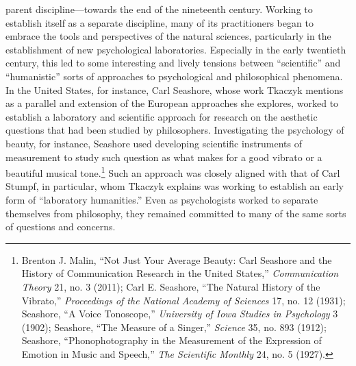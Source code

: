 \documentclass{tufte-handout}
\begin{document}
\noindent parent
discipline---towards the end of the nineteenth century. Working to
establish itself as a separate discipline, many of its practitioners
began to embrace the tools and perspectives of the natural sciences,
particularly in the establishment of new psychological laboratories.
Especially in the early twentieth century, this led to some interesting
and lively tensions between ``scientific'' and ``humanistic'' sorts of
approaches to psychological and philosophical phenomena. In the United
States, for instance, Carl Seashore, whose work Tkaczyk mentions as a
parallel and extension of the European approaches she explores, worked
to establish a laboratory and scientific approach for research on the
aesthetic questions that had been studied by philosophers. Investigating
the psychology of beauty, for instance, Seashore used developing
scientific instruments of measurement to study such question as what
makes for a good vibrato or a beautiful musical tone.\footnote{Brenton
  J. Malin, ``Not Just Your Average Beauty: Carl Seashore and the
  History of Communication Research in the United States,''
  \emph{Communication Theory} 21, no. 3 (2011); Carl E. Seashore, ``The
  Natural History of the Vibrato,'' \emph{Proceedings of the National
  Academy of Sciences} 17, no. 12 (1931); Seashore, ``A Voice
  Tonoscope,'' \emph{University of Iowa Studies in Psychology} 3 (1902);
  Seashore, ``The Measure of a Singer,'' \emph{Science} 35, no. 893
  (1912); Seashore, ``Phonophotography in the Measurement of the
  Expression of Emotion in Music and Speech,'' \emph{The Scientific
  Monthly} 24, no. 5 (1927).} Such an approach was closely aligned with
that of Carl Stumpf, in particular, whom Tkaczyk explains was working to
establish an early form of ``laboratory humanities.'' Even as
psychologists worked to separate themselves from philosophy, they
remained committed to many of the same sorts of questions and concerns.
\end{document}
